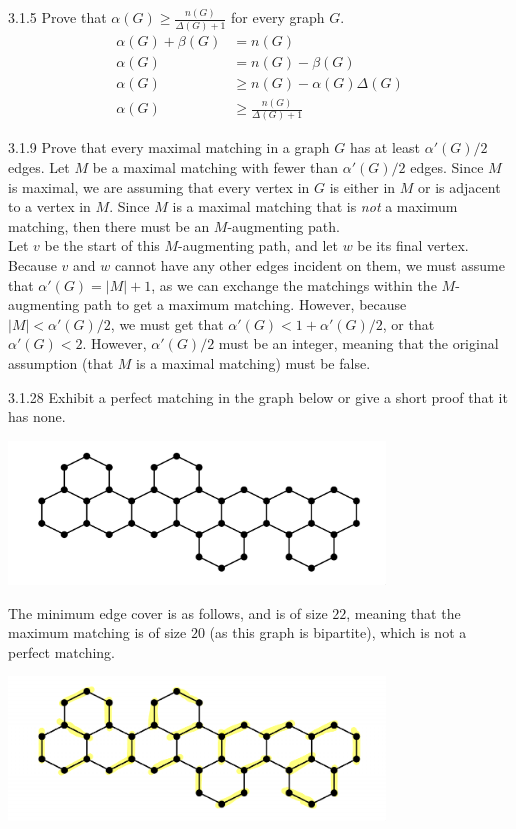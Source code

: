 \documentclass[10pt]{extarticle}
\begin{document}
  \begin{problem}{3.1.5}
    Prove that $\alpha(G) \geq \frac{n(G)}{\Delta(G)+1}$ for every graph $G$.
    \tcblower
    \begin{align*}
      \alpha(G) + \beta(G) &= n(G) \\
      \alpha(G) &= n(G) - \beta(G) \\
      \alpha(G) &\geq n(G) - \alpha(G)\Delta(G) \tag*{maximum theoretical size of a minimum edge cover} \\
      \alpha(G) &\geq \frac{n(G)}{\Delta(G) + 1}
    \end{align*}
  \end{problem}
  \begin{problem}{3.1.9}
    Prove that every maximal matching in a graph $G$ has at least $\alpha'(G)/2$ edges.
    \tcblower
    Let $M$ be a maximal matching with fewer than $\alpha'(G)/2$ edges. Since $M$ is maximal, we are assuming that every vertex in $G$ is either in $M$ or is adjacent to a vertex in $M$. Since $M$ is a maximal matching that is \textit{not} a maximum matching, then there must be an $M$-augmenting path.\\

    Let $v$ be the start of this $M$-augmenting path, and let $w$ be its final vertex. Because $v$ and $w$ cannot have any other edges incident on them, we must assume that $\alpha'(G) = |M| + 1$, as we can exchange the matchings within the $M$-augmenting path to get a maximum matching. However, because $|M| < \alpha'(G)/2$, we must get that $\alpha'(G) < 1 + \alpha'(G)/2$, or that $\alpha'(G) < 2$. However, $\alpha'(G)/2$ must be an integer, meaning that the original assumption (that $M$ is a maximal matching) must be false.
  \end{problem}
  \begin{problem}{3.1.28}
    Exhibit a perfect matching in the graph below or give a short proof that it has none. 
    \begin{center}
      \includegraphics[width=10cm]{3_1_28_question}
    \end{center}
    \tcblower
    The minimum edge cover is as follows, and is of size $22$, meaning that the maximum matching is of size $20$ (as this graph is bipartite), which is not a perfect matching.
    \begin{center}
      \includegraphics[width=10cm]{3_1_28_ans.pdf}
    \end{center}
  \end{problem}
\end{document}
